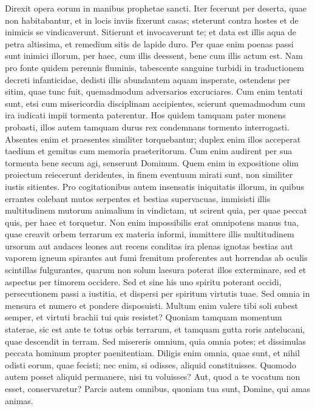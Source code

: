\begin{biblechapter}  
\verse Direxit opera eorum in manibus prophetae sancti. 
\verse Iter fecerunt per deserta, quae non habitabantur, et in locis inviis fixerunt casas; 
\verse steterunt contra hostes et de inimicis se vindicaverunt. 
\verse Sitierunt et invocaverunt te; et data est illis aqua de petra altissima, et remedium sitis de lapide duro. 
\verse Per quae enim poenas passi sunt inimici illorum, per haec, cum illis deessent, bene cum illis actum est. 
\verse Nam pro fonte quidem perennis fluminis, tabescente sanguine turbidi 
\verse in traductionem decreti infanticidae, dedisti illis abundantem aquam insperate, 
\verse ostendens per sitim, quae tunc fuit, quemadmodum adversarios excruciares. 
\verse Cum enim tentati sunt, etsi cum misericordia disciplinam accipientes, scierunt quemadmodum cum ira iudicati impii tormenta paterentur. 
\verse Hos quidem tamquam pater monens probasti, illos autem tamquam durus rex condemnans tormento interrogasti. 
\verse Absentes enim et praesentes similiter torquebantur; 
\verse duplex enim illos acceperat taedium et gemitus cum memoria praeteritorum. 
\verse Cum enim audirent per sua tormenta bene secum agi, senserunt Dominum. 
\verse Quem enim in expositione olim proiectum reiecerunt deridentes, in finem eventuum mirati sunt, non similiter iustis sitientes. 
\verse Pro cogitationibus autem insensatis iniquitatis illorum, in quibus errantes colebant mutos serpentes et bestias supervacuas, immisisti illis multitudinem mutorum animalium in vindictam, 
\verse ut scirent quia, per quae peccat quis, per haec et torquetur. 
\verse Non enim impossibilis erat omnipotens manus tua, quae creavit orbem terrarum ex materia informi, immittere illis multitudinem ursorum aut audaces leones 
\verse aut recens conditas ira plenas ignotas bestias aut vaporem igneum spirantes aut fumi fremitum proferentes aut horrendas ab oculis scintillas fulgurantes, 
\verse quarum non solum laesura poterat illos exterminare, sed et aspectus per timorem occidere. 
\verse Sed et sine his uno spiritu poterant occidi, persecutionem passi a iustitia, et dispersi per spiritum virtutis tuae. Sed omnia in mensura et numero et pondere disposuisti. 
\verse Multum enim valere tibi soli subest semper, et virtuti brachii tui quis resistet? 
\verse Quoniam tamquam momentum staterae, sic est ante te totus orbis terrarum, et tamquam gutta roris antelucani, quae descendit in terram. 
\verse Sed misereris omnium, quia omnia potes; et dissimulas peccata hominum propter paenitentiam. 
\verse Diligis enim omnia, quae sunt, et nihil odisti eorum, quae fecisti; nec enim, si odisses, aliquid constituisses. 
\verse Quomodo autem posset aliquid permanere, nisi tu voluisses? Aut, quod a te vocatum non esset, conservaretur? 
\verse Parcis autem omnibus, quoniam tua sunt, Domine, qui amas animas. 
\end{biblechapter}

